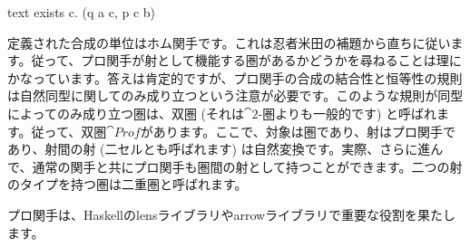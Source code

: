 \begin{snip}{text}
exists c. (q a c, p c b)
\end{snip}
定義された合成の単位はホム関手です。これは忍者米田の補題から直ちに従います。従って、プロ関手が射として機能する圏があるかどうかを尋ねることは理にかなっています。答えは肯定的ですが、プロ関手の合成の結合性と恒等性の規則は自然同型に関してのみ成り立つという注意が必要です。このような規則が同型によってのみ成り立つ圏は、双圏 (それは$\cat{2}$-圏よりも一般的です) と呼ばれます。従って、双圏$\cat{Prof}$があります。ここで、対象は圏であり、射はプロ関手であり、射間の射 (二セルとも呼ばれます) は自然変換です。実際、さらに進んで、通常の関手と共にプロ関手も圏間の射として持つことができます。二つの射のタイプを持つ圏は二重圏と呼ばれます。

プロ関手は、Haskellのlensライブラリやarrowライブラリで重要な役割を果たします。



